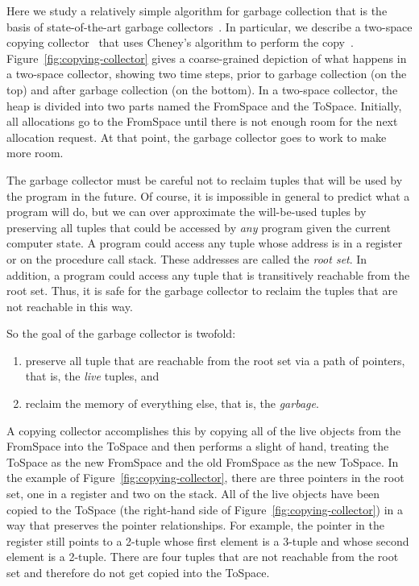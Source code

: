 \documentclass[11pt]{book}
\begin{document}
Here we study a relatively simple algorithm for garbage collection
that is the basis of state-of-the-art garbage
collectors~\citep{Lieberman:1983aa,Ungar:1984aa,Jones:1996aa,Detlefs:2004aa,Dybvig:2006aa,Tene:2011kx}. In
particular, we describe a two-space copying
collector~\citep{Wilson:1992fk} that uses Cheney's algorithm to
perform the
copy~\citep{Cheney:1970aa}. Figure~\ref{fig:copying-collector} gives a
coarse-grained depiction of what happens in a two-space collector,
showing two time steps, prior to garbage collection (on the top) and
after garbage collection (on the bottom). In a two-space collector,
the heap is divided into two parts named the FromSpace and the
ToSpace. Initially, all allocations go to the FromSpace until there is
not enough room for the next allocation request. At that point, the
garbage collector goes to work to make more room.

The garbage collector must be careful not to reclaim tuples that will
be used by the program in the future. Of course, it is impossible in
general to predict what a program will do, but we can over approximate
the will-be-used tuples by preserving all tuples that could be
accessed by \emph{any} program given the current computer state.  A
program could access any tuple whose address is in a register or on
the procedure call stack. These addresses are called the \emph{root
  set}. In addition, a program could access any tuple that is
transitively reachable from the root set. Thus, it is safe for the
garbage collector to reclaim the tuples that are not reachable in this
way.

So the goal of the garbage collector is twofold:
\begin{enumerate}
\item preserve all tuple that are reachable from the root set via a
  path of pointers, that is, the \emph{live} tuples, and
\item reclaim the memory of everything else, that is, the
  \emph{garbage}.
\end{enumerate}
A copying collector accomplishes this by copying all of the live
objects from the FromSpace into the ToSpace and then performs a slight
of hand, treating the ToSpace as the new FromSpace and the old
FromSpace as the new ToSpace.  In the example of
Figure~\ref{fig:copying-collector}, there are three pointers in the
root set, one in a register and two on the stack.  All of the live
objects have been copied to the ToSpace (the right-hand side of
Figure~\ref{fig:copying-collector}) in a way that preserves the
pointer relationships. For example, the pointer in the register still
points to a 2-tuple whose first element is a 3-tuple and whose second
element is a 2-tuple.  There are four tuples that are not reachable
from the root set and therefore do not get copied into the ToSpace.
\end{document}
